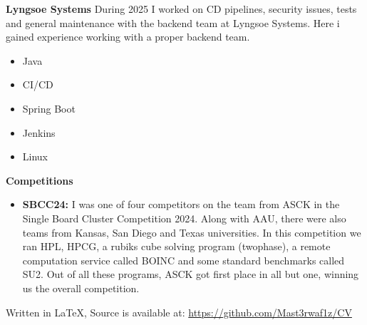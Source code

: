 \documentclass[a4paper, 14pt]{article}
\newcommand{\myitem}[1]{\item[\color{myorange}$\circ$]#1}
\newcommand{\newcvsection}[2]{
    \noindent\huge \textbf{#1} \color{myorange}\hrulefill\color{black}
    
    \normalsize
    #2    
    \vspace{.1cm}
}
\begin{document}
{\begin{itemize}
            \begin{minipage}{.70\textwidth}
                \myitem {
                    \textbf{Lyngsoe Systems} During 2025 I worked on CD pipelines, security issues, tests and general maintenance with the backend team at Lyngsoe Systems. Here i gained experience working with a proper backend team.
                }
            \end{minipage}
            \hfill
            \begin{minipage}{.20\textwidth}
                \begin{mybox}
                    \begin{itemize}
                        \item[$\cdot$] Java
                        \item[$\cdot$] CI/CD
                        \item[$\cdot$] Spring Boot
                        \item[$\cdot$] Jenkins
                        \item[$\cdot$] Linux
                    \end{itemize}
                \end{mybox}
            \end{minipage}
        \end{itemize}
    }

    \newcvsection{Competitions}{
        \begin{itemize}
            \myitem{
                \textbf{SBCC24: } I was one of four competitors on the team from ASCK in the Single Board Cluster Competition 2024.
                Along with AAU, there were also teams from Kansas, San Diego and Texas universities.
                In this competition we ran HPL, HPCG, a rubiks cube solving program (twophase), a remote computation service called BOINC and some standard benchmarks called SU2.
                Out of all these programs, ASCK got first place in all but one, winning us the overall competition.
            }
        \end{itemize}
    }

    \vspace*{\fill}
    \tiny Written in \LaTeX, Source is available at: \href{https://github.com/Mast3rwaf1z/CV}{https://github.com/Mast3rwaf1z/CV}
\end{document}
